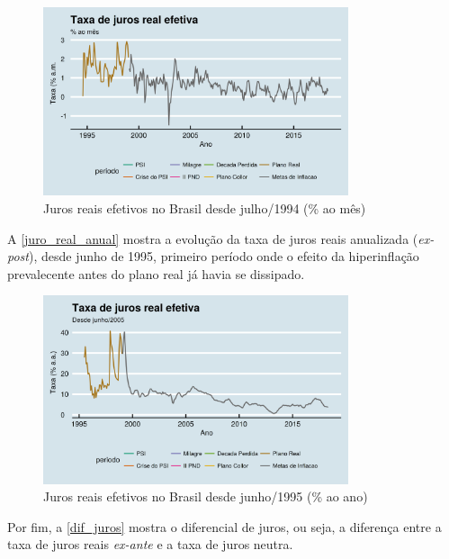 \documentclass[
	10pt,				%
	openright,			%
	twoside,			%
	a5paper,			%
	english,			%
	french,				%
	spanish,			%
	brazil				%
	]{abntex2}
\begin{document}
\begin{figure}[htbp]
\caption{Juros reais efetivos no Brasil desde julho/1994 (\% ao mês)}\label{juro_real}
\begin{center}
\includegraphics[width=0.80000\textwidth]{imagens/juro_real-1.png}
\end{center}
\end{figure}

A \autoref{juro_real_anual} mostra a evolução da taxa de juros reais
anualizada (\emph{ex-post}), desde junho de 1995, primeiro período onde
o efeito da hiperinflação prevalecente antes do plano real já havia se
dissipado.

\begin{figure}[htbp]
\caption{Juros reais efetivos no Brasil desde junho/1995 (\% ao ano)}\label{juro_real_anual}
\begin{center}
\includegraphics[width=0.80000\textwidth]{imagens/juro_real_anual-1.png}
\end{center}
\end{figure}

Por fim, a \autoref{dif_juros} mostra o diferencial de juros, ou seja, a
diferença entre a taxa de juros reais \emph{ex-ante} e a taxa de juros
neutra.
\end{document}
